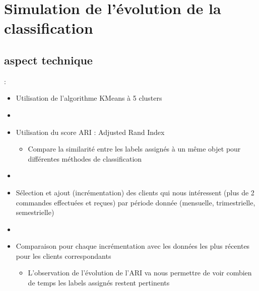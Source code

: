 \documentclass[8pt,aspectratio=169,hyperref={unicode=true}]{beamer}
\begin{document}
\section{Simulation de l'évolution de la classification}
\subsection{aspect technique}
\begin{frame}{\insertsection: \insertsubsection}
    \begin{itemize}
        \item Utilisation de l'algorithme KMeans à 5 clusters
        \item[]
        \item Utilisation du score ARI : Adjusted Rand Index
        \begin{itemize}
            \item Compare la similarité entre les labels assignés à un même objet pour différentes méthodes de classification
        \end{itemize}
        \item[]
        \item Sélection et ajout (incrémentation) des clients qui nous intéressent (plus de 2 commandes effectuées et reçues) par période donnée (mensuelle, trimestrielle, semestrielle)
        \item[]
        \item Comparaison pour chaque incrémentation avec les données les plus récentes pour les clients correspondants
        \begin{itemize}
            \item L'observation de l'évolution de l'ARI va nous permettre de voir combien de temps les labels assignés restent pertinents
        \end{itemize}
    \end{itemize}
\end{frame}
\end{document}
